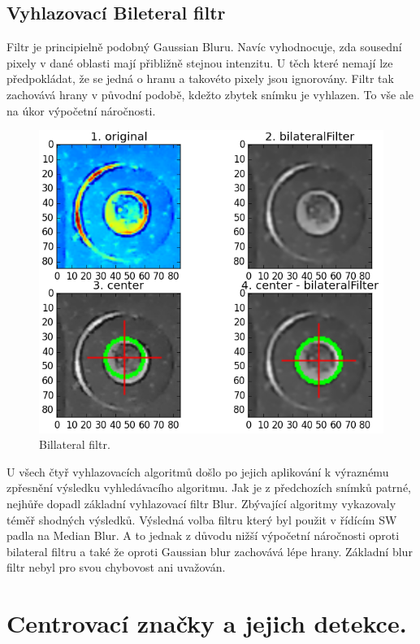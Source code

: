 \subsection{Vyhlazovací Bileteral filtr}

Filtr je principielně podobný Gaussian Bluru. Navíc vyhodnocuje, zda sousední pixely v dané oblasti mají přibližně stejnou intenzitu. U těch které nemají lze předpokládat, že se jedná o hranu a takovéto pixely jsou ignorovány. Filtr tak zachovává hrany v původní podobě, kdežto zbytek snímku je vyhlazen. To vše ale na úkor výpočetní náročnosti.

\begin{figure}[H]
  \centering
    \includegraphics[width=0.8\linewidth]{obrazky/billateralFilter.png}%
    \caption{Billateral filtr.}
    \label{fig:billateralfilter}
\end{figure}

\bigskip
U všech čtyř vyhlazovacích algoritmů došlo po jejich aplikování k výraznému zpřesnění výsledku vyhledávacího algoritmu. Jak je z předchozích snímků patrné, nejhůře dopadl základní vyhlazovací filtr Blur. Zbývající algoritmy vykazovaly téměř shodných výsledků. Výsledná volba filtru který byl použit v řídícím SW padla na Median Blur. A to jednak z důvodu nižší výpočetní náročnosti oproti bilateral filtru a také že oproti Gaussian blur zachovává lépe hrany. Základní blur filtr nebyl pro svou chybovost ani uvažován.


\section{Centrovací značky a jejich detekce.}

